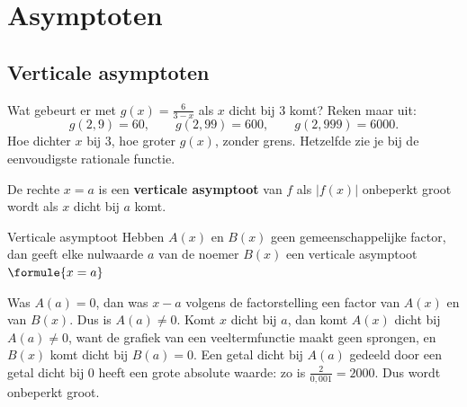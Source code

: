 \begin{oefeningen}
\end{oefeningen}

\section{Asymptoten}

\subsection{Verticale asymptoten}

Wat gebeurt er met $g(x) = \frac{6}{3 - x}$ als $x$ dicht bij $3$ komt? Reken maar uit:
\[g(2{,}9) = 60, \qquad g(2{,}99) = 600, \qquad g(2{,}999) = 6000 .\]
Hoe dichter $x$ bij $3$, hoe groter $g(x)$, zonder grens. Hetzelfde zie je bij de eenvoudigste rationale functie.


\begin{theorie}
De rechte $x = a$ is een \textbf{\textcolor{accent}{verticale asymptoot}} van $f$ als $|f(x)|$ onbeperkt groot wordt als $x$ dicht bij $a$ komt.

\begin{stelling}{Verticale asymptoot}
Hebben $A(x)$ en $B(x)$ geen gemeenschappelijke factor, dan geeft elke nulwaarde $a$ van de noemer $B(x)$ een verticale asymptoot \quad $\formule{x = a}$
\end{stelling}

\begin{bewijs}
Was $A(a) = 0$, dan was $x - a$ volgens de factorstelling een factor van $A(x)$ en van $B(x)$. Dus is $A(a) \neq 0$. Komt $x$ dicht bij $a$, dan komt $A(x)$ dicht bij $A(a) \neq 0$, want de grafiek van een veeltermfunctie maakt geen sprongen, en $B(x)$ komt dicht bij $B(a) = 0$. Een getal dicht bij $A(a)$ gedeeld door een getal dicht bij $0$ heeft een grote absolute waarde: zo is $\frac{2}{0{,}001} = 2000$. Dus wordt
onbeperkt groot.
\end{bewijs}
\end{theorie}

